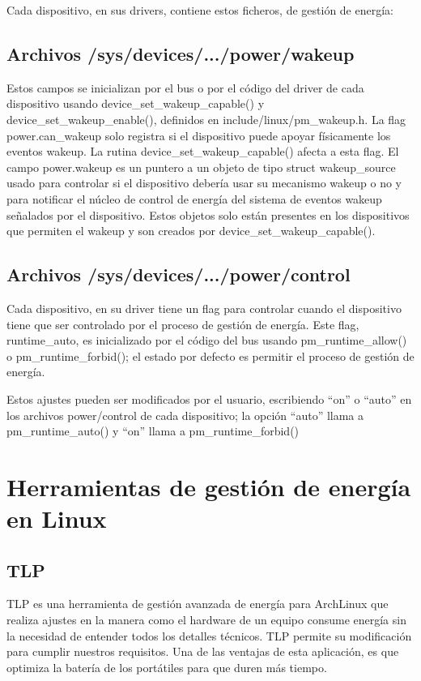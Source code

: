 \documentclass[12pt, spanish]{article}
\begin{document}
Cada dispositivo, en sus drivers, contiene estos ficheros, de gestión de energía:

\subsection{Archivos /sys/devices/.../power/wakeup}

    Estos campos se inicializan por el bus o por el código del driver de cada dispositivo usando device\_set\_wakeup\_capable() y device\_set\_wakeup\_enable(), definidos en include/linux/pm\_wakeup.h.
La flag power.can\_wakeup solo registra si el dispositivo puede apoyar físicamente los eventos wakeup. La rutina device\_set\_wakeup\_capable() afecta a esta flag. El campo power.wakeup es un puntero a un objeto de tipo struct wakeup\_source usado para controlar si el dispositivo debería usar su mecanismo wakeup o no y para notificar el núcleo de control de energía del sistema de eventos wakeup señalados por el dispositivo. Estos objetos solo están presentes en los dispositivos que permiten el wakeup y son creados por device\_set\_wakeup\_capable().


\subsection{Archivos /sys/devices/.../power/control}

    Cada dispositivo, en su driver tiene un flag para controlar cuando el dispositivo tiene que ser controlado por el  proceso de gestión de energía. Este flag, runtime\_auto, es inicializado por el código del bus usando pm\_runtime\_allow() o pm\_runtime\_forbid(); el estado por defecto es permitir el proceso de gestión de energía.

    Estos ajustes pueden ser modificados por el usuario, escribiendo “on” o “auto” en los archivos power/control de cada dispositivo; la opción “auto” llama a pm\_runtime\_auto() y “on” llama a pm\_runtime\_forbid()


\newpage


\section{Herramientas de gestión de energía en Linux}

\subsection{TLP}

TLP es una herramienta de gestión avanzada de energía para ArchLinux que realiza ajustes en la manera como el hardware de un equipo consume energía sin la necesidad de entender todos los detalles técnicos. TLP permite su modificación para cumplir nuestros requisitos.
Una de las ventajas de esta aplicación, es que optimiza la batería de los portátiles para que duren más tiempo.
\end{document}
